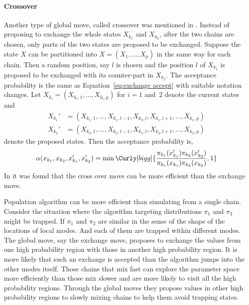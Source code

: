 \paragraph{Crossover}

Another type of global move, called crossover was mentioned in \cite{Liang:2001dc}. Instead of proposing to exchange the whole states $X_{k_1}$ and $X_{k_2}$, after the two chains are chosen, only parts of the two states are proposed to be exchanged. Suppose the state $X$ can be partitioned into $X = (X_1,\dots,X_p)$ in the same way for each chain. Then a random position, say $l$ is chosen and the position $l$ of $X_{k_1}$ is proposed to be exchanged with its counter-part in $X_{k_2}$. The acceptance probability is the same as Equation~\eqref{eq:exchange accept} with suitable notation changes. Let $X_{k_i} = (X_{k_i,1},\dots,X_{k_i,p})$ for $i = 1$ and~$2$ denote the current states and
\begin{align*}
  X_{k_1}' &= (X_{k_1,1},\dots,X_{k_1,l-1},
  X_{k_2,l},X_{k_1,l+1},\dots,X_{k_1,p}) \\
  X_{k_2}' &= (X_{k_2,1},\dots,X_{k_2,l-1},
  X_{k_1,l},X_{k_2,l+1},\dots,X_{k_2,p})
\end{align*}
denote the proposed states. Then the acceptance probability is,
\begin{equation}
  \alpha(x_{k_1},x_{k_2},x_{k_1}',x_{k_2}') = \min\Curly[bigg]
  {\frac{\pi_{k_1}(x_{k_1}')\pi_{k_2}(x_{k_2}')}
  {\pi_{k_1}(x_{k_1})\pi_{k_2}(x_{k_2})},1}
  \label{eq:cross accept}
\end{equation}
In \cite{Jasra:2007in} it was found that the cross over move can be more efficient than the exchange move.

Population \mcmc algorithm can be more efficient than simulating from a single chain. Consider the situation where the \mcmc algorithm targeting distributions $\pi_1$ and $\pi_2$ might be trapped. If $\pi_1$ and $\pi_2$ are similar in the sense of the shape of the locations of local modes. And each of them are trapped within different modes. The global move, say the exchange move, proposes to exchange the values from one high probability region with those in another high probability region. It is more likely that such an exchange is accepted than the \mcmc algorithm jumps into the other modes itself. Those chains that mix fast can explore the parameter space more efficiently than those mix slower and are more likely to visit all the high probability regions. Through the global moves they propose values in other high probability regions to slowly mixing chains to help them avoid trapping states.

